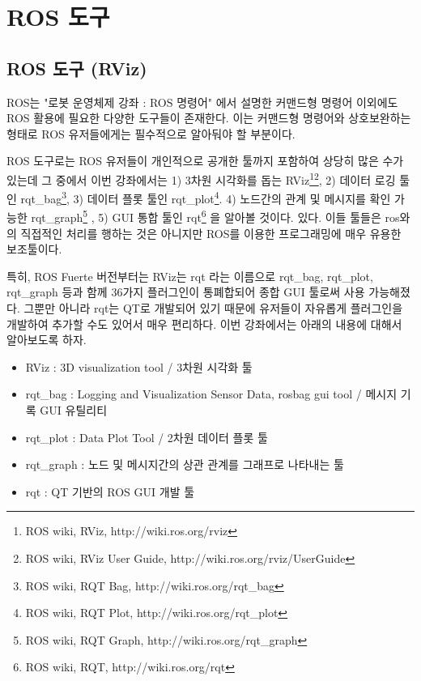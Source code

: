 

\chapter{ROS 도구}

\section{ROS 도구 (RViz)}

ROS는 "로봇 운영체제 강좌 : ROS 명령어" 에서 설명한 커맨드형 명령어 이외에도 ROS 활용에 필요한 다양한 도구들이 존재한다. 이는 커맨드형 명령어와 상호보완하는 형태로 ROS 유저들에게는 필수적으로 알아둬야 할 부분이다.

ROS 도구로는 ROS 유저들이 개인적으로 공개한 툴까지 포함하여 상당히 많은 수가 있는데 그 중에서 이번 강좌에서는 1) 3차원 시각화를 돕는 RViz\footnote{ROS wiki, RViz, http://wiki.ros.org/rviz}\footnote{ROS wiki, RViz User Guide, http://wiki.ros.org/rviz/UserGuide}, 2) 데이터 로깅 툴인 rqt\_bag\footnote{ROS wiki, RQT Bag, http://wiki.ros.org/rqt\_bag}, 3) 데이터 플롯 툴인 rqt\_plot\footnote{ROS wiki, RQT Plot, http://wiki.ros.org/rqt\_plot}. 4) 노드간의 관계 및 메시지를 확인 가능한 rqt\_graph\footnote{ROS wiki, RQT Graph, http://wiki.ros.org/rqt\_graph} , 5) GUI 통합 툴인 rqt\footnote{ROS wiki, RQT, http://wiki.ros.org/rqt} 을 알아볼 것이다. 있다. 이들 툴들은 ros와의 직접적인 처리를 행하는 것은 아니지만 ROS를 이용한 프로그래밍에 매우 유용한 보조툴이다. 

특히, ROS Fuerte 버전부터는 RViz는 rqt 라는 이름으로 rqt\_bag, rqt\_plot, rqt\_graph 등과 함께 36가지 플러그인이 통폐합되어 종합 GUI 툴로써 사용 가능해졌다. 그뿐만 아니라 rqt는 QT로 개발되어 있기 때문에 유저들이 자유롭게 플러그인을 개발하여 추가할 수도 있어서 매우 편리하다. 이번 강좌에서는 아래의 내용에 대해서 알아보도록 하자.

\begin{itemize}[leftmargin=*]
\item RViz : 3D visualization tool / 3차원 시각화 툴
\item rqt\_bag : Logging and Visualization Sensor Data, rosbag gui tool / 메시지 기록 GUI 유틸리티
\item rqt\_plot : Data Plot Tool / 2차원 데이터 플롯 툴 
\item rqt\_graph : 노드 및 메시지간의 상관 관계를 그래프로 나타내는 툴
\item rqt : QT 기반의 ROS GUI 개발 툴
\end{itemize}

